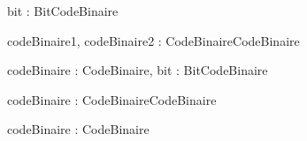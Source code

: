 \begin{algorithme}

    {bit : Bit}{CodeBinaire}

    {codeBinaire1, codeBinaire2 : CodeBinaire}{CodeBinaire}

    {codeBinaire : CodeBinaire, bit : Bit}{CodeBinaire}

    {
    }
    {}

    {codeBinaire : CodeBinaire}{CodeBinaire}

    {codeBinaire : CodeBinaire}{}

\end{algorithme}